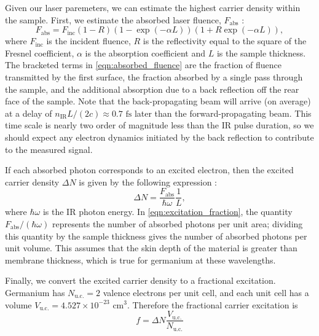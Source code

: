 Given our laser paremeters, we can estimate the highest carrier density within the sample. First, we estimate the absorbed laser fluence, $F_{\text{abs}}$ \cite{harbCarrierRelaxationLattice2006}:
\begin{equation}
F_{\text{abs}} = F_{\text{inc}} \left(1-R\right) \left( 1-\exp(-\alpha L) \right) \left(1+R \exp(-\alpha L)\right),
\label{eqn:absorbed_fluence}
\end{equation}
where $F_{\text{inc}}$ is the incident fluence, $R$ is the reflectivity equal to the square of the Fresnel coefficient, $\alpha$ is the absorption coefficient and $L$ is the sample thickness. The bracketed terms in \cref{eqn:absorbed_fluence} are the fraction of fluence transmitted by the first surface, the fraction absorbed by a single pass through the sample, and the additional absorption due to a back reflection off the rear face of the sample. Note that the back-propagating beam will arrive (on average) at a delay of $n_{\text{IR}} L/(2c) \approx 0.7 \text{ fs}$ later than the forward-propagating beam. This time scale is nearly two order of magnitude less than the IR pulse duration, so we should expect any electron dynamics initiated by the back reflection to contribute to the measured signal.

If each absorbed photon corresponds to an excited electron, then the excited carrier density $\Delta N$ is given by the following expression \cite{cushingDifferentiatingPhotoexcitedCarrier2019}:
\begin{equation}
\Delta N = \frac{F_{\text{abs}}}{\hbar \omega} \frac{1}{L},
\label{eqn:excitation_fraction}
\end{equation}
where $\hbar \omega$ is the IR photon energy. In \cref{eqn:excitation_fraction}, the quantity $F_{\text{abs}} / (\hbar \omega)$ represents the number of absorbed photons per unit area; dividing this quantity by the sample thickness gives the number of absorbed photons per unit volume. This assumes that the skin depth of the material is greater than membrane thickness, which is true for germanium at these wavelengths.

Finally, we convert the excited carrier density to a fractional excitation. Germanium has $N_{\text{u.c.}}=2$ valence electrons per unit cell, and each unit cell has a volume $V_{\text{u.c.}}=4.527 \times 10^{-23} \text{ cm}^{3}$. Therefore the fractional carrier excitation is
\begin{equation}
f = \Delta N \frac{V_{\text{u.c.}}}{N_{\text{u.c.}}}
\end{equation}

